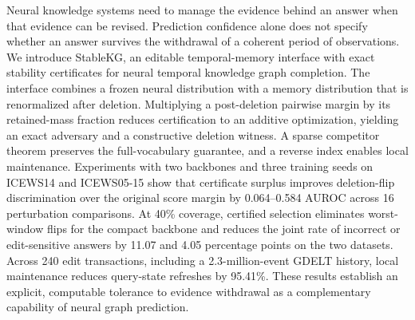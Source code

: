 Neural knowledge systems need to manage the evidence behind an answer when that evidence can be revised. Prediction confidence alone does not specify whether an answer survives the withdrawal of a coherent period of observations. We introduce StableKG, an editable temporal-memory interface with exact stability certificates for neural temporal knowledge graph completion. The interface combines a frozen neural distribution with a memory distribution that is renormalized after deletion. Multiplying a post-deletion pairwise margin by its retained-mass fraction reduces certification to an additive optimization, yielding an exact adversary and a constructive deletion witness. A sparse competitor theorem preserves the full-vocabulary guarantee, and a reverse index enables local maintenance. Experiments with two backbones and three training seeds on ICEWS14 and ICEWS05-15 show that certificate surplus improves deletion-flip discrimination over the original score margin by 0.064--0.584 AUROC across 16 perturbation comparisons. At 40\% coverage, certified selection eliminates worst-window flips for the compact backbone and reduces the joint rate of incorrect or edit-sensitive answers by 11.07 and 4.05 percentage points on the two datasets. Across 240 edit transactions, including a 2.3-million-event GDELT history, local maintenance reduces query-state refreshes by 95.41\%. These results establish an explicit, computable tolerance to evidence withdrawal as a complementary capability of neural graph prediction.
